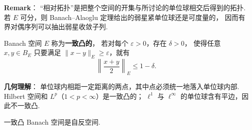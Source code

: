 \begin{remarkbox}
    \textbf{Remark}：
    “相对拓扑”是把整个空间的开集与所讨论的单位球相交后得到的拓扑.
    若 $E$ 可分，则 Banach--Alaoglu 定理给出的弱星紧单位球还是可度量的，
    因而有界对偶序列可以抽出弱星收敛子列.
\end{remarkbox}


\begin{definition}[一致凸空间]
    Banach 空间 $E$ 称为\textbf{一致凸的}，
    若对每个 $\varepsilon>0$，存在 $\delta>0$，
    使得任意 $x,y\in B_E$ 只要满足
    $\|x-y\|_E\ge\varepsilon$，就有
    \[
        \left\|\frac{x+y}{2}\right\|_E\le1-\delta.
    \]
\end{definition}

\begin{remarkbox}
    \textbf{几何理解}：
    单位球内相距一定距离的两点，其中点必须统一地落入单位球内部.
    Hilbert 空间和 $L^p$（$1<p<\infty$）是一致凸的；
    $\ell^1$ 与 $\ell^\infty$ 的单位球含有平边，因此不一致凸.
\end{remarkbox}

\begin{theorem}
    一致凸 Banach 空间是自反空间.
\end{theorem}

